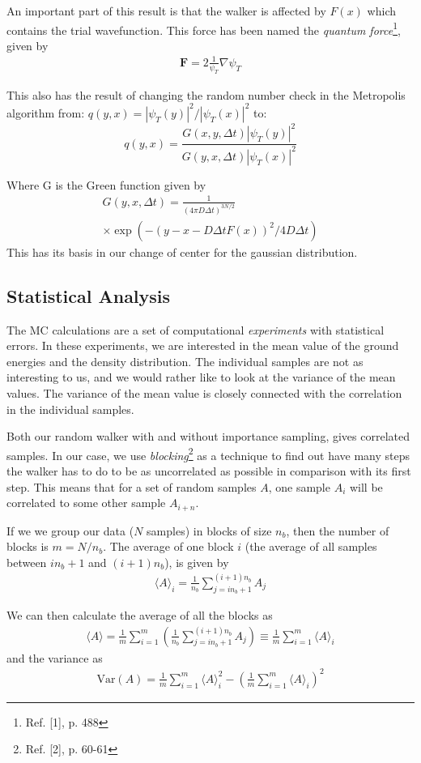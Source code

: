 \documentclass[twocolumns, a4paper,11pt,fleqn]{extarticle}
\newcommand{\eq}[1]{{\small\begin{align*}#1\end{align*}}}
\renewcommand\vec[1]{\boldsymbol{\mathbf{#1}}}
\newcommand{\Var}[1]{\mathrm{Var}(#1)}
\begin{document}
An important part of this result is that the walker is affected by $F(x)$
which contains the trial wavefunction. This force has been named 
the \textit{quantum force}\footnote{Ref. [1], p. 488}, given by
\begin{align*}
\vec F = 2\frac{1}{\psi_T}\nabla \psi_T
\end{align*}

This also has the result of changing the random number check in the 
Metropolis algorithm from:
$q(y,x) = |\psi_T(y)|^2/|\psi_T(x)|^2$ to: 
\[
q(y,x) = \frac{G(x,y,\Delta t)|\psi_T(y)|^2}{G(y,x,\Delta t)|\psi_T(x)|^2}
\]

Where G is the Green function given by
\eq{
  G(y,x,\Delta t) =  \frac{1}{(4\pi D\Delta t)^{3N/2}}\\ \times \exp{\left(-(y-x-D\Delta t F(x))^2/4D\Delta t\right)}
}
This has its basis in our change of center for the gaussian distribution.

\subsection{Statistical Analysis}
The MC calculations are a set of computational \textit{experiments} 
with statistical errors. In these experiments, we are interested in the mean
value of the ground energies and the density distribution. The 
individual samples are not as interesting to us, and we would rather like
to look at the variance of the mean values. 
The variance of the mean value is closely connected with the correlation
in the individual samples. 


Both our random walker with and without importance sampling, gives correlated
samples. In our case, we use \textit{blocking}\footnote{Ref. [2], p. 60-61}
as a technique to find out have many steps
the walker has to do to be as uncorrelated as possible in comparison with its first step.
This means that for a set of random samples $A$, one sample $A_i$ will be correlated
to some other sample $A_{i+n}$.

If we we group our data ($N$ samples) in blocks of size $n_b$,
then the number of blocks is $m = N/n_b$.
The average of one block $i$ (the average of all samples
between $i n_b + 1$ and $(i+1)n_b$), is given by 
\eq{
\langle A \rangle_i = \frac{1}{n_b}\sum_{j=in_b+1}^{(i+1)n_b} A_j
}

We can then calculate the average of all the blocks as
\eq{
  \langle A \rangle = 
  \frac{1}{m}\sum_{i=1}^m \left(
    \frac{1}{n_b}\sum_{j=in_b+1}^{(i+1)n_b} A_j \right)
  \equiv \frac{1}{m}\sum_{i=1}^m \langle A \rangle_i
}
and the variance as
\eq{
  \Var{A}=
  \frac{1}{m}\sum_{i=1}^m \langle A \rangle_i^2
  -\left(\frac{1}{m}\sum_{i=1}^m \langle A \rangle_i\right)^2
}
\end{document}
